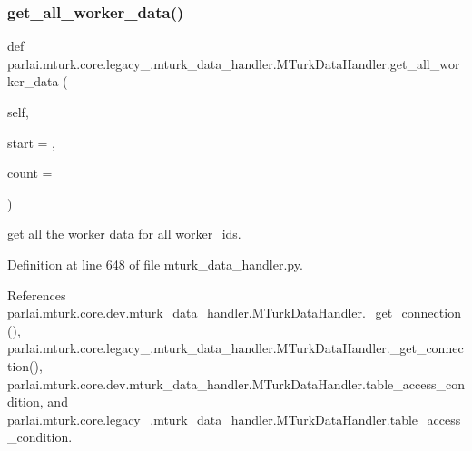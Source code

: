 \subsubsection{\texorpdfstring{get\+\_\+all\+\_\+worker\+\_\+data()}{get\_all\_worker\_data()}}
{\footnotesize\ttfamily def parlai.\+mturk.\+core.\+legacy\+\_.\+mturk\+\_\+data\+\_\+handler.\+M\+Turk\+Data\+Handler.\+get\+\_\+all\+\_\+worker\+\_\+data (\begin{DoxyParamCaption}\item[{}]{self,  }\item[{}]{start = {},  }\item[{}]{count = {} }\end{DoxyParamCaption})}

\begin{DoxyVerb}get all the worker data for all worker_ids.\end{DoxyVerb}
 

Definition at line 648 of file mturk\+\_\+data\+\_\+handler.\+py.



References parlai.\+mturk.\+core.\+dev.\+mturk\+\_\+data\+\_\+handler.\+M\+Turk\+Data\+Handler.\+\_\+get\+\_\+connection(), parlai.\+mturk.\+core.\+legacy\+\_.\+mturk\+\_\+data\+\_\+handler.\+M\+Turk\+Data\+Handler.\+\_\+get\+\_\+connection(), parlai.\+mturk.\+core.\+dev.\+mturk\+\_\+data\+\_\+handler.\+M\+Turk\+Data\+Handler.\+table\+\_\+access\+\_\+condition, and parlai.\+mturk.\+core.\+legacy\+\_.\+mturk\+\_\+data\+\_\+handler.\+M\+Turk\+Data\+Handler.\+table\+\_\+access\+\_\+condition.


